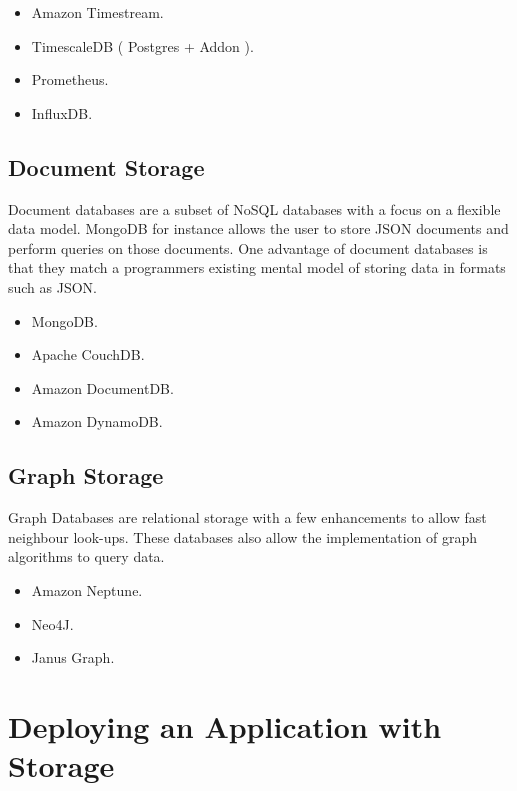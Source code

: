 \documentclass{csse4400}
\begin{document}
\begin{itemize}
  \item Amazon Timestream.
  \item TimescaleDB ( Postgres + Addon ).
  \item Prometheus.
  \item InfluxDB.
\end{itemize}

\subsection{Document Storage}

Document databases are a subset of NoSQL databases with a focus on a flexible data model.
MongoDB for instance allows the user to store JSON documents and perform queries on those documents.
One advantage of document databases is that they match a programmers existing mental model of storing data in formats such as JSON.

\begin{itemize}
  \item MongoDB.
  \item Apache CouchDB.
  \item Amazon DocumentDB.
  \item Amazon DynamoDB.
\end{itemize}

\subsection{Graph Storage}


Graph Databases are relational storage with a few enhancements to allow fast neighbour look-ups.
These databases also allow the implementation of graph algorithms to query data.

\begin{itemize}
  \item Amazon Neptune.
  \item Neo4J.
  \item Janus Graph.
\end{itemize}

\section{Deploying an Application with Storage}
\end{document}

